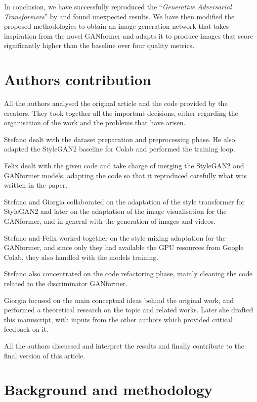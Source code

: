 \documentclass{article}
\begin{document}
	In conclusion, we have successfully reproduced the ``\emph{Generative Adversarial Transformers}'' 
	by \citet{hudson2021generative} and found unexpected results.
	We have then modified the proposed methodologies to obtain an image generation network that 
	takes inspiration from the 
	novel GANformer and adapts it to produce images that score significantly higher than the baseline 
	over four quality metrics.
	
	\section{Authors contribution}
	All the authors analysed the original article and the code provided by the creators. 
	They took together all the important decisions, either regarding the organisation of the work and the 
	problems that have arisen.
	
	Stefano dealt with the dataset preparation and preprocessing phase. He also adapted the StyleGAN2 
	baseline for Colab and performed the training loop.
	
	Felix dealt with the given code and take charge of merging the StyleGAN2 and GANformer models, 
	adapting the code so that it reproduced carefully what was written in the paper.
	
	Stefano and Giorgia collaborated on the adaptation of the style transformer for StyleGAN2 and later 
	on the adaptation of the image visualisation for the GANformer, and in general with the generation 
	of images and videos. 
	
	Stefano and Felix worked together on the style mixing adaptation for the GANformer, and since only 
	they had available the GPU resources from Google Colab, they also handled with the models training.
	
	Stefano also concentrated on the code refactoring phase, mainly cleaning the code related to the 
	discriminator GANformer.
	
	Giorgia focused on the main conceptual ideas behind the original work, and performed a theoretical 
	research on the topic and related works. 
	Later she drafted this manuscript, with inputs from the other authors which provided critical 
	feedback on it. 
	
	All the authors discussed and interpret the results and finally contribute to the final version of this 
	article.
	
	\clearpage
	\appendix
	\section{Background and methodology}\label{sec:appendix}
	
\end{document}
